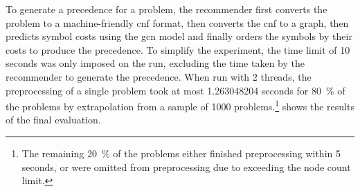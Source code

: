 To generate a precedence for a problem,
the recommender first converts the problem to a machine-friendly \gls{cnf} format,
then converts the \gls{cnf} to a graph,
then predicts symbol costs using the \gls{gcn} model
and finally orders the symbols by their costs to produce the precedence.
To simplify the experiment, the time limit of 10 seconds was only imposed on the \Vampire{} run,
excluding the time taken by the recommender to generate the precedence.
When run with 2 threads,
the preprocessing of a single problem
took at most \num[round-mode=places,round-precision=2]{1.263048204} seconds
for \SI{80}{\percent} of the problems
by extrapolation from a sample of \num{1000} problems.\footnote{The remaining \SI{20}{\percent} of the problems either finished preprocessing within 5 seconds, or were omitted from preprocessing due to exceeding the node count limit.}
 shows the results of the final evaluation.

